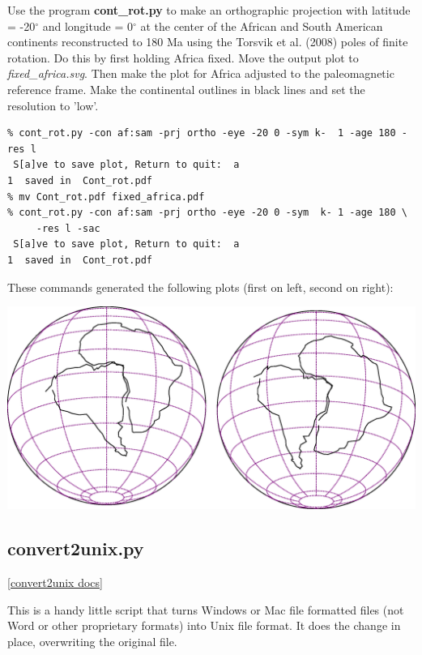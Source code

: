 \documentclass[11pt]{book}
\begin{document}
{{{Use the program {\bf cont\_rot.py} to make an orthographic projection with latitude = -20$^{\circ}$ and longitude = 0$^{\circ}$ at the center of the African and South American  continents reconstructed to 180 Ma using the Torsvik et al. (2008) poles of finite rotation.  \nocite{torsvik08} Do this by first holding Africa fixed.  Move the output plot to {\it fixed\_africa.svg}.  Then make the plot for Africa adjusted  to the paleomagnetic reference frame.  Make the continental outlines in black lines and set the resolution to 'low'.  

\begin{verbatim}
% cont_rot.py -con af:sam -prj ortho -eye -20 0 -sym k-  1 -age 180 -res l
 S[a]ve to save plot, Return to quit:  a
1  saved in  Cont_rot.pdf
% mv Cont_rot.pdf fixed_africa.pdf
% cont_rot.py -con af:sam -prj ortho -eye -20 0 -sym  k- 1 -age 180 \
     -res l -sac
 S[a]ve to save plot, Return to quit:  a
1  saved in  Cont_rot.pdf
\end{verbatim}

These commands generated the following plots (first on left, second on right):

{%
\hskip 1cm %
\includegraphics[width=15cm]{EPSfiles/controt.eps}}

\subsection{convert2unix.py}
\href{http://earthref.org/PmagPy/pmagpydocs/convert2unix-module.html}{[convert2unix docs]}

This is a handy little script that turns Windows or Mac file formatted files (not Word or other proprietary formats) into Unix file format.  It does the change in place, overwriting the original file.

}}}
\end{document}
